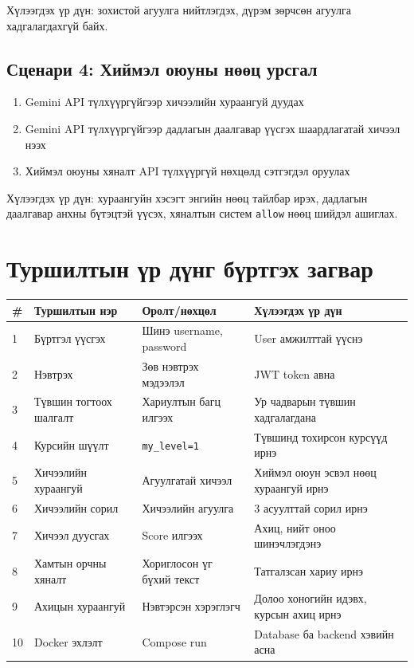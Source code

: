Хүлээгдэх үр дүн: зохистой агуулга нийтлэгдэх, дүрэм зөрчсөн агуулга хадгалагдахгүй байх.

\subsection{Сценари 4: Хиймэл оюуны нөөц урсгал}
\begin{enumerate}
\item Gemini API түлхүүргүйгээр хичээлийн хураангуй дуудах
\item Gemini API түлхүүргүйгээр дадлагын даалгавар үүсгэх шаардлагатай хичээл нээх
\item Хиймэл оюуны хяналт API түлхүүргүй нөхцөлд сэтгэгдэл оруулах
\end{enumerate}

Хүлээгдэх үр дүн: хураангуйн хэсэгт энгийн нөөц тайлбар ирэх, дадлагын даалгавар анхны бүтэцтэй үүсэх, хяналтын систем \texttt{allow} нөөц шийдэл ашиглах.

\section{Туршилтын үр дүнг бүртгэх загвар}
\begin{longtable}{|p{0.8cm}|p{4.2cm}|p{3.5cm}|p{4.5cm}|}
\hline
\textbf{\#} & \textbf{Туршилтын нэр} & \textbf{Оролт/нөхцөл} & \textbf{Хүлээгдэх үр дүн} \\
\hline
1 & Бүртгэл үүсгэх & Шинэ username, password & User амжилттай үүснэ \\
\hline
2 & Нэвтрэх & Зөв нэвтрэх мэдээлэл & JWT token авна \\
\hline
3 & Түвшин тогтоох шалгалт & Хариултын багц илгээх & Ур чадварын түвшин хадгалагдана \\
\hline
4 & Курсийн шүүлт & \texttt{my\_level=1} & Түвшинд тохирсон курсүүд ирнэ \\
\hline
5 & Хичээлийн хураангуй & Агуулгатай хичээл & Хиймэл оюун эсвэл нөөц хураангуй ирнэ \\
\hline
6 & Хичээлийн сорил & Хичээлийн агуулга & 3 асуулттай сорил ирнэ \\
\hline
7 & Хичээл дуусгах & Score илгээх & Ахиц, нийт оноо шинэчлэгдэнэ \\
\hline
8 & Хамтын орчны хяналт & Хориглосон үг бүхий текст & Татгалзсан хариу ирнэ \\
\hline
9 & Ахицын хураангуй & Нэвтэрсэн хэрэглэгч & Долоо хоногийн идэвх, курсын ахиц ирнэ \\
\hline
10 & Docker эхлэлт & Compose run & Database ба backend хэвийн асна \\
\hline
\end{longtable}

